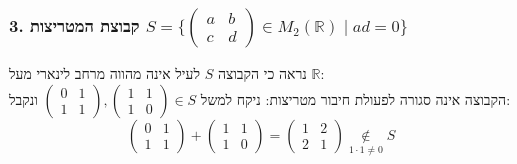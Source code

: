 \documentclass{article}
\newcommand\underrel[2]{\mathrel{\mathop{#2}\limits_{#1}}}
\begin{document}
\subsubsection*{3. קבוצת המטריצות $S = \{ \begin{pmatrix}
            a & b \\
            c & d
        \end{pmatrix} \in M_2(\mathbb{R}) \; | \;
        ad=0\}$}
נראה כי הקבוצה $S$ לעיל אינה מהווה מרחב לינארי מעל $\mathbb{R}$: \\
הקבוצה אינה סגורה לפעולת חיבור מטריצות: ניקח למשל $\begin{pmatrix}
        0 & 1 \\
        1 & 1
    \end{pmatrix}, \begin{pmatrix}
        1 & 1 \\
        1 & 0
    \end{pmatrix} \in S$ ונקבל:
\[
    \begin{pmatrix}
        0 & 1 \\
        1 & 1
    \end{pmatrix} + \begin{pmatrix}
        1 & 1 \\
        1 & 0
    \end{pmatrix} = \begin{pmatrix}
        1 & 2 \\
        2 & 1
    \end{pmatrix}
    \underrel{1\cdot 1 \ne 0}{\notin} S
\]
\end{document}
